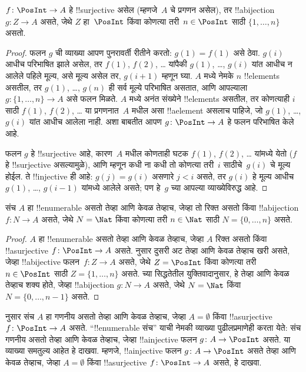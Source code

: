 \documentclass[../../../include/open-logic-section]{subfiles}
\begin{document}
\begin{prop}
$f\colon \PosInt \to A$ हे !!{surjective} असेल (म्हणजे~$A$
चे प्रगणन असेल), तर !!a{bijection} $g\colon Z \to A$ असते,
जेथे $Z$ हा~$\PosInt$ किंवा कोणत्या तरी~$n \in \PosInt$
साठी $\{1, \dots, n\}$ असतो.
\end{prop}

\begin{proof}
  फलन $g$ ची व्याख्या आपण पुनरावर्ती रीतीने करतो: $g(1) = f(1)$
  असे ठेवा. $g(i)$ आधीच परिभाषित झाले असेल, तर $f(1)$, $f(2)$,
  \dots{} यांपैकी $g(1)$, \dots, $g(i)$ यांत आधीच न आलेले
  पहिले मूल्य, असे मूल्य असेल तर, $g(i+1)$ म्हणून घ्या.
  $A$ मध्ये नेमके $n$ !!{element}s असतील, तर $g(1)$, \dots, $g(n)$
  ही सर्व मूल्ये परिभाषित असतात, आणि आपल्याला
  $g\colon \{1, \dots, n\} \to A$ असे फलन मिळते.
  $A$ मध्ये अनंत संख्येने !!{element}s असतील, तर कोणत्याही $i$
  साठी $f(1)$, $f(2)$, \dots{} या प्रगणनात~$A$ मधील असा
  !!a{element} असलाच पाहिजे, जो $g(1)$, \dots, $g(i)$ यांत
  आधीच आलेला नाही. अशा बाबतीत आपण $g\colon \PosInt \to A$
  हे फलन परिभाषित केले आहे.

  फलन $g$ हे !!{surjective} आहे, कारण~$A$ मधील कोणताही घटक
  $f(1)$, $f(2)$, \dots{} यांमध्ये येतो ($f$ हे !!{surjective}
  असल्यामुळे), आणि म्हणून कधी ना कधी तो कोणत्या तरी~$i$
  साठीचे~$g(i)$ चे मूल्य होईल. ते !!{injective} ही आहे:
  $g(j) = g(i)$ असणारे $j < i$ असते, तर $g(i)$ हे मूल्य
  आधीच $g(1)$, \dots, $g(i-1)$ यांमध्ये आलेले असते;
  पण हे~$g$ च्या आपल्या व्याख्येविरुद्ध आहे.
\end{proof}

\begin{cor}
संच $A$ हा !!{enumerable} असतो तेव्हा आणि केवळ तेव्हाच, जेव्हा
तो रिक्त असतो किंवा !!a{bijection} $f\colon N \to A$ असते,
जेथे $N = \Nat$ किंवा कोणत्या तरी $n \in \Nat$ साठी
$N = \{0, \dots, n\}$ असते.
\end{cor}

\begin{proof}
$A$ हा !!{enumerable} असतो तेव्हा आणि केवळ तेव्हाच, जेव्हा $A$
रिक्त असतो किंवा !!a{surjective} $f\colon \PosInt \to A$ असते.
 नुसार दुसरी अट तेव्हा आणि केवळ तेव्हाच
खरी असते, जेव्हा !!a{bijective} फलन~$f\colon Z \to A$ असते,
जेथे $Z = \PosInt$ किंवा कोणत्या तरी $n \in \PosInt$ साठी
$Z = \{1, \dots, n\}$ असते.  च्या
सिद्धतेतील युक्तिवादानुसार, हे तेव्हा आणि केवळ तेव्हाच शक्य होते,
जेव्हा !!a{bijection} $g\colon N \to A$ असते, जेथे
$N = \Nat$ किंवा $N = \{0, \dots, n-1\}$ असते.
%
\end{proof}

\begin{prob}
   नुसार संच $A$ हा गणनीय
  असतो तेव्हा आणि केवळ तेव्हाच, जेव्हा $A = \emptyset$ किंवा
  !!a{surjective} $f\colon \PosInt \to A$ असते.
  ``!!{enumerable} संच'' याची नेमकी व्याख्या पुढीलप्रमाणेही करता येते:
  संच गणनीय असतो तेव्हा आणि केवळ तेव्हाच, जेव्हा !!a{injective}
  फलन $g\colon A \to \PosInt$ असते. या व्याख्या समतुल्य आहेत
  हे दाखवा. म्हणजे, !!a{injective} फलन $g\colon A \to \PosInt$
  असते तेव्हा आणि केवळ तेव्हाच, जेव्हा $A = \emptyset$ किंवा
  !!a{surjective} $f\colon \PosInt \to A$ असते, हे दाखवा.
\end{prob}
\end{document}
